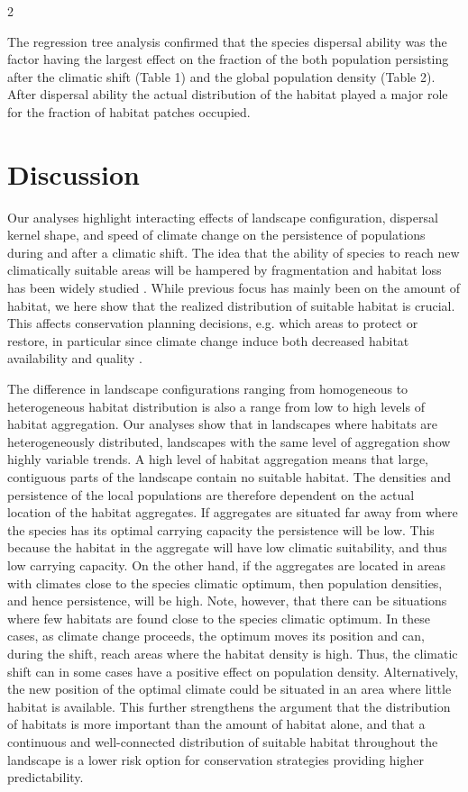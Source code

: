 \documentclass[12pt,pdftex]{article}
\begin{document}
\begin{spacing}{2}

The regression tree analysis confirmed that the species dispersal ability was the factor having the largest effect on the fraction of the both population persisting after the climatic shift (Table 1) and the global population density (Table 2). After dispersal ability the actual distribution of the habitat played a major role for the fraction of habitat patches occupied. 


\section*{Discussion}

Our analyses highlight interacting effects of landscape configuration, dispersal kernel shape, and speed of climate change on the persistence of populations during and after a climatic shift. The idea that the ability of species to reach new  climatically suitable areas will be hampered by fragmentation and habitat loss has been widely studied \citep{Thomas2004}. While previous focus has mainly been on the amount of habitat, we here show that the realized distribution of suitable habitat is crucial. This affects conservation planning decisions, e.g. which areas to protect or restore, in particular since climate change induce both decreased habitat availability and quality \citep{Martin2016}.


The difference in landscape configurations ranging from homogeneous to heterogeneous habitat distribution is also a range from low to high levels of habitat aggregation. Our analyses show that in landscapes where habitats are heterogeneously distributed, landscapes with the same level of aggregation show highly variable trends. A high level of habitat aggregation means that large, contiguous parts of the landscape contain no suitable habitat. The densities and persistence of the local populations are therefore dependent on the actual location of the habitat aggregates. If aggregates are situated far away from where the species has its optimal carrying capacity the persistence will be low. This because the habitat in the aggregate will have low climatic suitability, and thus low carrying capacity. On the other hand, if the aggregates are located in areas with climates close to the species climatic optimum, then population densities, and hence persistence, will be high. Note, however, that there can be situations where few habitats are found close to the species climatic optimum. In these cases, as climate change proceeds, the optimum moves its position and can, during the shift, reach areas where the habitat density is high. Thus, the climatic shift can in some cases have a positive effect on population density. Alternatively, the new position of the optimal climate could be situated in an area where little habitat is available. This further strengthens the argument that the distribution of habitats is more important than the amount of habitat alone, and that a continuous and well-connected distribution of suitable habitat throughout the landscape is a lower risk option for conservation strategies providing higher predictability. 



\end{spacing}
\end{document}
